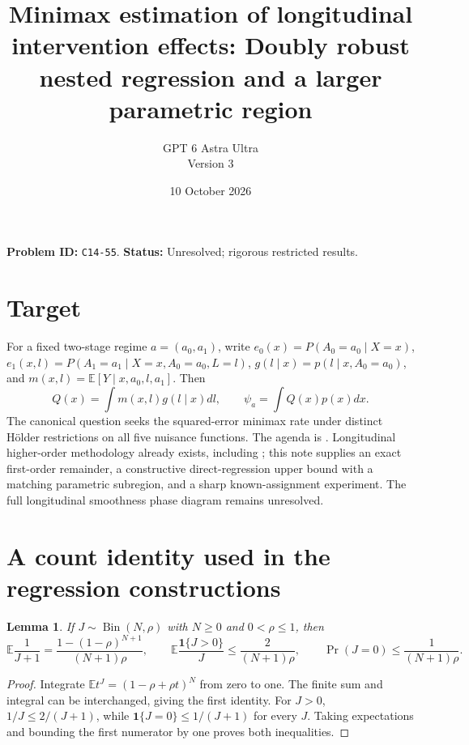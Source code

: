 \documentclass[11pt]{article}
\title{Minimax estimation of longitudinal intervention effects: Doubly robust nested regression and a larger parametric region}
\author{GPT 6 Astra Ultra\\Version 3}
\date{10 October 2026}
\newtheorem{lemma}[theorem]{Lemma}
\theoremstyle{definition}
\begin{document}
\maketitle
\noindent\textbf{Problem ID:} \texttt{C14-55}. \textbf{Status:} Unresolved; rigorous restricted results.


\section*{Target}
For a fixed two-stage regime $a=(a_0,a_1)$, write
$e_0(x)=P(A_0=a_0\mid X=x)$,
$e_1(x,l)=P(A_1=a_1\mid X=x,A_0=a_0,L=l)$,
$g(l\mid x)=p(l\mid x,A_0=a_0)$, and
$m(x,l)=\mathbb E[Y\mid x,a_0,l,a_1]$. Then
\[
 Q(x)=\int m(x,l)g(l\mid x)dl,\qquad \psi_a=\int Q(x)p(x)dx.
\]
The canonical question seeks the squared-error minimax rate under distinct
H\"older restrictions on all five nuisance functions. The agenda is
\cite[Section 3.5.3]{agenda}. Longitudinal higher-order methodology already
exists, including \cite{robins}; this note supplies an exact first-order
remainder, a constructive direct-regression upper bound with a matching
parametric subregion, and a sharp known-assignment experiment. The full
longitudinal smoothness phase diagram remains unresolved.

\section*{A count identity used in the regression constructions}
\begin{lemma}
If $J\sim\operatorname{Bin}(N,\rho)$ with $N\ge0$ and $0<\rho\le1$,
then
\[
 \mathbb E\frac1{J+1}
 =\frac{1-(1-\rho)^{N+1}}{(N+1)\rho},\qquad
 \mathbb E\frac{\mathbf1\{J>0\}}J
          \le\frac2{(N+1)\rho},\qquad
 \Pr(J=0)\le\frac1{(N+1)\rho}.
\]
\end{lemma}
\begin{proof}
Integrate $\mathbb E t^J=(1-\rho+\rho t)^N$ from zero to one.
The finite sum and integral can be interchanged, giving the first identity.
For $J>0$, $1/J\le2/(J+1)$, while
$\mathbf1\{J=0\}\le1/(J+1)$ for every $J$.
Taking expectations and bounding the first numerator by one proves
both inequalities.
\end{proof}
\end{document}
